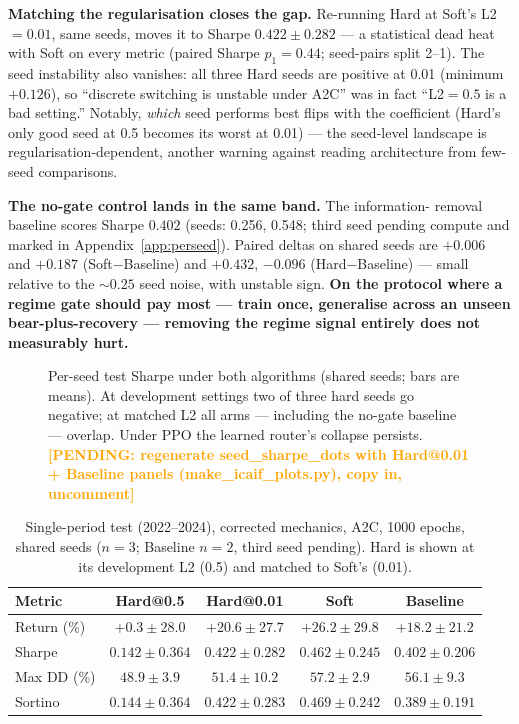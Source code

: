 \documentclass[sigconf,anonymous,review]{acmart}
\newcommand{\pending}[1]{\textcolor{orange}{\textbf{[PENDING: #1]}}}
\begin{document}
\textbf{Matching the regularisation closes the gap.} Re-running Hard at
Soft's L2${=}0.01$, same seeds, moves it to Sharpe $0.422\pm0.282$ ---
a statistical dead heat with Soft on every metric (paired Sharpe
$p_1{=}0.44$; seed-pairs split 2--1). The seed instability also
vanishes: all three Hard seeds are positive at 0.01 (minimum $+0.126$),
so ``discrete switching is unstable under A2C'' was in fact ``L2${=}0.5$
is a bad setting.'' Notably, \emph{which} seed performs best flips with
the coefficient (Hard's only good seed at 0.5 becomes its worst at
0.01) --- the seed-level landscape is regularisation-dependent, another
warning against reading architecture from few-seed comparisons.

\textbf{The no-gate control lands in the same band.} The information-
removal baseline scores Sharpe $0.402$ (seeds: 0.256, 0.548; third seed
pending compute and marked in Appendix~\ref{app:perseed}). Paired deltas
on shared seeds are $+0.006$ and $+0.187$ (Soft$-$Baseline) and $+0.432$,
$-0.096$ (Hard$-$Baseline) --- small relative to the ${\sim}0.25$ seed
noise, with unstable sign. \textbf{On the protocol where a regime gate
should pay most --- train once, generalise across an unseen
bear-plus-recovery --- removing the regime signal entirely does not
measurably hurt.}

\begin{figure}[t]
\centering
\caption{Per-seed test Sharpe under both algorithms (shared seeds; bars
are means). At development settings two of three hard seeds go negative;
at matched L2 all arms --- including the no-gate baseline --- overlap.
Under PPO the learned router's collapse persists.
\pending{regenerate seed\_sharpe\_dots with Hard@0.01 + Baseline panels
(make\_icaif\_plots.py), copy in, uncomment}}
\label{fig:seed-dots}
\end{figure}

\begin{table}[t]
\caption{Single-period test (2022--2024), corrected mechanics, A2C,
1000 epochs, shared seeds ($n{=}3$; Baseline $n{=}2$, third seed
pending). Hard is shown at its development L2 (0.5) and matched to
Soft's (0.01).}
\label{tab:single-a2c}
\small
\setlength{\tabcolsep}{3pt}
\begin{tabular}{lcccc}
\toprule
Metric & Hard@0.5 & Hard@0.01 & Soft & Baseline \\
\midrule
Return (\%)  & $+0.3 \pm 28.0$   & $+20.6 \pm 27.7$  & $+26.2 \pm 29.8$  & $+18.2 \pm 21.2$ \\
Sharpe       & $0.142 \pm 0.364$ & $0.422 \pm 0.282$ & $0.462 \pm 0.245$ & $0.402 \pm 0.206$ \\
Max DD (\%)  & $48.9 \pm 3.9$    & $51.4 \pm 10.2$   & $57.2 \pm 2.9$    & $56.1 \pm 9.3$ \\
Sortino      & $0.144 \pm 0.364$ & $0.422 \pm 0.283$ & $0.469 \pm 0.242$ & $0.389 \pm 0.191$ \\
\bottomrule
\end{tabular}
\end{table}
\end{document}
